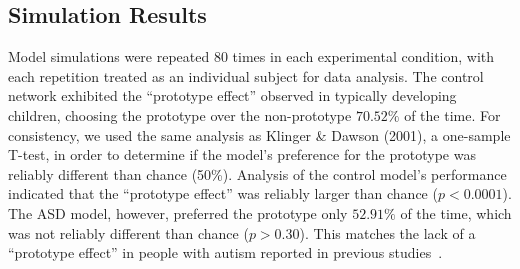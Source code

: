 

\subsection{Simulation Results}
Model simulations were repeated $80$ times in each experimental condition, with each repetition treated as an individual subject for data analysis. The control network exhibited the ``prototype effect'' observed in typically developing children, choosing the prototype over the non-prototype $70.52\%$ of the time.
For consistency, we used the same analysis as Klinger \& Dawson (2001), a one-sample T-test, in order to determine if the model's preference for the prototype was reliably different than chance (50\%). Analysis of the control model's performance indicated that the ``prototype effect'' was reliably larger than chance ($p < 0.0001$). The ASD model, however, preferred the prototype only $52.91\%$ of the time, which was not reliably different than chance ($p > 0.30$). This matches the lack of a ``prototype effect'' in people with autism reported in previous studies~\cite{KlingerLG:2001:Prototype,GastgebHZ:2009:Prototype}.

